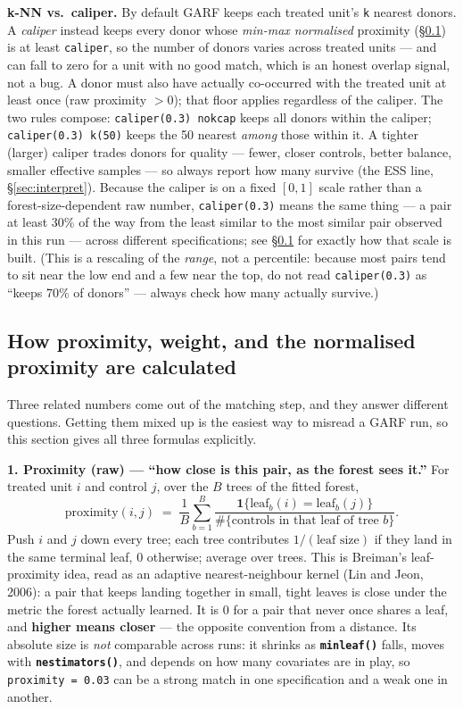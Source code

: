 \documentclass[11pt,a4paper]{article}
\newcommand{\opt}[1]{\texttt{\textbf{#1}}}
\newcommand{\code}[1]{\texttt{#1}}
\begin{document}
\medskip
\noindent\textbf{k-NN vs.\ caliper.} By default GARF keeps each treated unit's \code{k} nearest
donors. A \emph{caliper} instead keeps every donor whose \emph{min-max normalised} proximity
(\S\ref{sec:proxcalc}) is at least \code{caliper}, so the number of donors varies across treated
units --- and can fall to zero for a unit with no good match, which is an honest overlap signal,
not a bug. A donor must also have actually co-occurred with the treated unit at least once (raw
proximity $>0$); that floor applies regardless of the caliper. The two rules compose:
\code{caliper(0.3) nokcap} keeps all donors within the caliper; \code{caliper(0.3) k(50)} keeps
the 50 nearest \emph{among} those within it. A tighter (larger) caliper trades donors for quality
--- fewer, closer controls, better balance, smaller effective samples --- so always report how
many survive (the ESS line, \S\ref{sec:interpret}). Because the caliper is on a fixed $[0,1]$
scale rather than a forest-size-dependent raw number, \code{caliper(0.3)} means the same thing
--- a pair at least 30\% of the way from the least similar to the most similar pair observed in
this run --- across different specifications; see \S\ref{sec:proxcalc} for exactly how that
scale is built. (This is a rescaling of the \emph{range}, not a percentile: because most pairs
tend to sit near the low end and a few near the top, do not read \code{caliper(0.3)} as
``keeps 70\% of donors'' --- always check how many actually survive.)

\subsection{How proximity, weight, and the normalised proximity are calculated}\label{sec:proxcalc}

Three related numbers come out of the matching step, and they answer different questions.
Getting them mixed up is the easiest way to misread a GARF run, so this section gives all three
formulas explicitly.

\medskip
\noindent\textbf{1. Proximity (raw) --- ``how close is this pair, as the forest sees it.''}
For treated unit $i$ and control $j$, over the $B$ trees of the fitted forest,
\[
\text{proximity}(i,j) \;=\; \frac{1}{B}\sum_{b=1}^{B}
\frac{\mathbf{1}\{\text{leaf}_b(i) = \text{leaf}_b(j)\}}{\#\{\text{controls in that leaf of tree } b\}}.
\]
Push $i$ and $j$ down every tree; each tree contributes $1/(\text{leaf size})$ if they land in the
same terminal leaf, $0$ otherwise; average over trees. This is Breiman's leaf-proximity idea, read
as an adaptive nearest-neighbour kernel (Lin and Jeon, 2006): a pair that keeps landing together
in small, tight leaves is close under the metric the forest actually learned. It is $0$ for a pair
that never once shares a leaf, and \textbf{higher means closer} --- the opposite convention from a
distance. Its absolute size is \emph{not} comparable across runs: it shrinks as \opt{minleaf()}
falls, moves with \opt{nestimators()}, and depends on how many covariates are in play, so
\code{proximity = 0.03} can be a strong match in one specification and a weak one in another.
\end{document}
